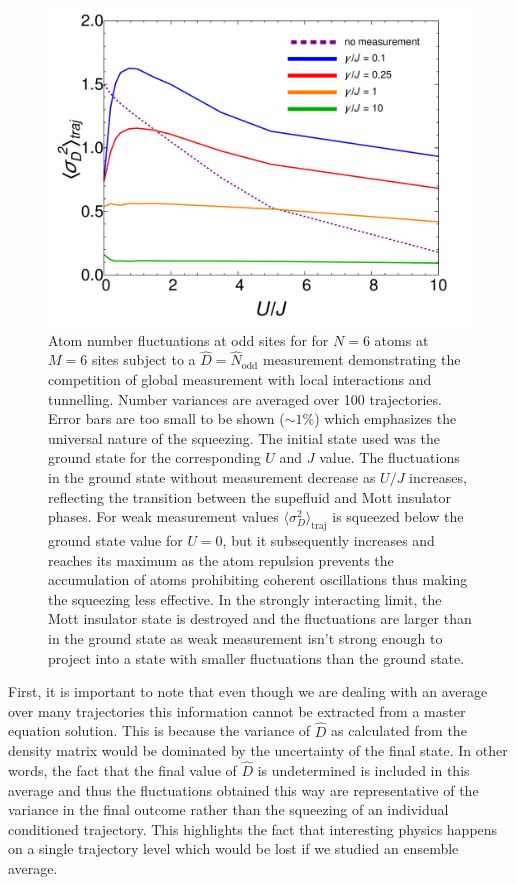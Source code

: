 \begin{figure}[htbp!]
  \centering
  \includegraphics[width=\textwidth]{Squeezing}
  \caption[Squeezing in the presence of Interactions]{Atom number
    fluctuations at odd sites for for $N = 6$ atoms at $M = 6$ sites
    subject to a $\hat{D} = \hat{N}_\mathrm{odd}$ measurement
    demonstrating the competition of global measurement with local
    interactions and tunnelling. Number variances are averaged over
    100 trajectories. Error bars are too small to be shown
    ($\sim 1\%$) which emphasizes the universal nature of the
    squeezing. The initial state used was the ground state for the
    corresponding $U$ and $J$ value. The fluctuations in the ground
    state without measurement decrease as $U / J$ increases,
    reflecting the transition between the supefluid and Mott insulator
    phases. For weak measurement values
    $\langle \sigma^2_D \rangle_\mathrm{traj}$ is squeezed below the
    ground state value for $U = 0$, but it subsequently increases and
    reaches its maximum as the atom repulsion prevents the
    accumulation of atoms prohibiting coherent oscillations thus
    making the squeezing less effective. In the strongly interacting
    limit, the Mott insulator state is destroyed and the fluctuations
    are larger than in the ground state as weak measurement isn't
    strong enough to project into a state with smaller fluctuations
    than the ground state.}
  \label{fig:squeezing}
\end{figure}

First, it is important to note that even though we are dealing with an
average over many trajectories this information cannot be extracted
from a master equation solution. This is because the variance of
$\hat{D}$ as calculated from the density matrix would be dominated by
the uncertainty of the final state. In other words, the fact that the
final value of $\hat{D}$ is undetermined is included in this average
and thus the fluctuations obtained this way are representative of the
variance in the final outcome rather than the squeezing of an
individual conditioned trajectory. This highlights the fact that
interesting physics happens on a single trajectory level which would
be lost if we studied an ensemble average.

